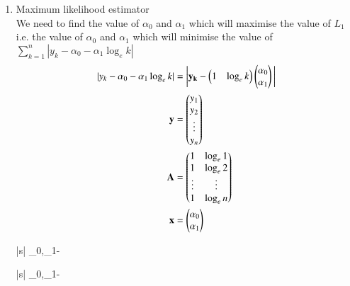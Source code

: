 \documentclass[journal,12pt,onecolumn]{IEEEtran}
\theoremstyle{remark}
\begin{document}
\begin{enumerate}
	\item Maximum likelihood estimator\\
	We need to find the value of $\alpha_{0}$ and $\alpha_{1}$ which will maximise the value of $L_{1}$ i.e. the value of 
	$\alpha_{0}$ and $\alpha_{1}$ which will minimise the value of $\sum_{k = 1}^{n}|y_{k}-\alpha_{0}-\alpha_{1} \log_{e}k|$
	\begin{align}
		|y_{k}-\alpha_{0}-\alpha_{1} \log_{e}k| &=
		\bigg|\mathbf{y_{k}} - \begin{pmatrix}1& \log_{e}k\end{pmatrix} \begin{pmatrix}\alpha_{0} \\ \alpha_{1}\end{pmatrix} \bigg|\\
		\mathbf{y} &= \begin{pmatrix}y_1 \\ y_2\\ \vdots \\ y_n\end{pmatrix}\\
		\mathbf{A} &= \begin{pmatrix}1&\log_{e}1\\1&\log_{e}2\\ \vdots & \vdots \\1&\log_{e}n\end{pmatrix}\\
		\mathbf{x} &= \begin{pmatrix}\alpha_{0} \\ \alpha_{1}\end{pmatrix}
	\end{align}
	\begin{mini*}|s|
		{\alpha_{0},\alpha_{1}}{-}
{}{}
\end{mini*}
	\begin{mini*}|s|
		{\alpha_{0},\alpha_{1}}{-}
{}{}
\end{mini*}
\end{enumerate}
\end{document}
